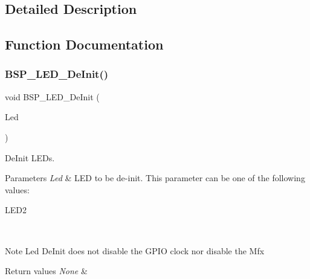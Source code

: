 \subsection{Detailed Description}


\subsection{Function Documentation}
\mbox{\label{group___s_t_m32_f0_x_x___n_u_c_l_e_o___l_e_d___functions_ga8cb1d5b32557d492b8bf0f7109bd6d3f}} 
\subsubsection{\texorpdfstring{B\+S\+P\+\_\+\+L\+E\+D\+\_\+\+De\+Init()}{BSP\_LED\_DeInit()}}
{\footnotesize\ttfamily void B\+S\+P\+\_\+\+L\+E\+D\+\_\+\+De\+Init (\begin{DoxyParamCaption}\item[{Led\+\_\+\+Type\+Def}]{Led }\end{DoxyParamCaption})}



De\+Init L\+E\+Ds. 


\begin{DoxyParams}{Parameters}
{\em Led} & L\+ED to be de-\/init. This parameter can be one of the following values\+: \begin{DoxyItemize}
\item L\+E\+D2 \end{DoxyItemize}
\\
\hline
\end{DoxyParams}
\begin{DoxyNote}{Note}
Led De\+Init does not disable the G\+P\+IO clock nor disable the Mfx 
\end{DoxyNote}

\begin{DoxyRetVals}{Return values}
{\em None} & \\
\hline
\end{DoxyRetVals}
\mbox{\label{group___s_t_m32_f0_x_x___n_u_c_l_e_o___l_e_d___functions_gab58a4f16a476a53653c5c400e3bed158}} 
